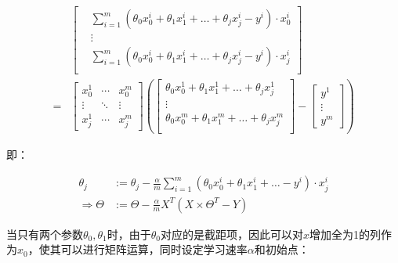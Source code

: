 \documentclass[12pt, a4paper]{article}
\begin{document}
\begin{enumerate}
          \begin{align*}
                &
              \begin{bmatrix}
                   & \sum_{i=1}^{m}(\theta_0x_0^i+\theta_1x_1^i+\dots+\theta_jx_j^i-y^i)\cdot x_0^i \\
                   & \vdots                                                                         \\
                   & \sum_{i=1}^{m}(\theta_0x_0^i+\theta_1x_1^i+\dots+\theta_jx_j^i-y^i)\cdot x_j^i \\
              \end{bmatrix}
              \\
              = &
              \begin{bmatrix}
                  x_0^1  & \cdots & x_0^m  \\
                  \vdots & \ddots & \vdots \\
                  x_j^1  & \cdots & x_j^m
              \end{bmatrix}
              \left(
              \begin{bmatrix}
                  \theta_0x_0^1+\theta_1x_1^1+\dots+\theta_jx_j^1 \\
                  \vdots                                          \\
                  \theta_0x_0^m+\theta_1x_1^m+\dots+\theta_jx_j^m \\
              \end{bmatrix}
              -
              \begin{bmatrix}
                  y^1    \\
                  \vdots \\
                  y^m
              \end{bmatrix}
              \right)
          \end{align*}

          即：

          \begin{align*}
              \theta_j          & :=\theta_j-\frac{\alpha}{m}\sum_{i=1}^{m}(\theta_0x_0^i+\theta_1x_1^i+\dots-y^i)\cdot x_j^i \\
              \Rightarrow\Theta & :=\Theta-\frac{\alpha}{m}X^T(X\times \Theta^T-Y)
          \end{align*}

          当只有两个参数$\theta_0,\theta_1$时，由于$\theta_0$对应的是截距项，因此可以对$x$增加全为1的列作为$x_0$，使其可以进行矩阵运算，同时设定学习速率$\alpha$和初始点：


\end{enumerate}
\end{document}
